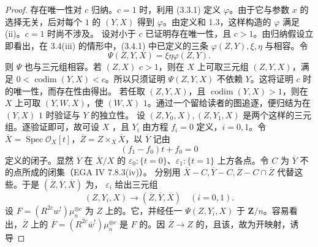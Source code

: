 \begin{proof}
存在唯一性对 $c$ 归纳。$c=1$ 时，利用 (3.3.1) 定义 $\varphi$。由于它与参数 $x$ 的选择无关，后对每个 $1$ 的 $(Y,X)$ 得到 $\varphi$。由定义和 1.3，这样构造的 $\varphi$ 满足 (ii)。$c=1$ 时尚不涉及。
设对小于 $c$ 已证明存在唯一性，且 $c>1$。由归纳假设立即看出，在 3.4(iii) 的情形中，(3.4.1) 中已定义的三条 $\varphi(Z,Y),\xi,\eta$ 与相容。令
\[\Psi(Z,Y,X)=\xi\eta\varphi(Z,Y).\]
则 $\Psi$ 也与三元组相容。若 $(Z,X)$  $c>1$，则在 $X$ 上可取三元组 $(Z,Y,X)$，满足 $0<\operatorname{codim}(Y,X)<c$。所以只须证明 $\Psi(Z,Y,X)$ 不依赖 $Y$。这将证明 $c$ 时的唯一性，而存在性由得出。
若任取 $(Z,Y,X)$，且 $\operatorname{codim}(Y,X)>1$，则在 $X$ 上可取 $(Y,W,X)$，使 $(W,X)$  $1$。通过一个留给读者的图追逐，便归结为在 $(Y,X)$  $1$ 时验证与 $Y$ 的独立性。
设 $(Z,Y_0,X),(Z,Y_1,X)$ 是两个这样的三元组。逐验证即可，故可设 $X$ ，且 $Y_i$ 由方程 $f_i=0$ 定义，$i=0,1$。令 $\overline X=\operatorname{Spec}\mathcal O_X[t]$，$\overline Z=Z\times_X\overline X$，以 $\overline Y$ 记由
\[(f_1-f_0)t+f_0=0\]
定义的闭子。显然 $\overline Y$ 在 $\overline X/X$ 的 $\varepsilon_0:\{t=0\}$、$\varepsilon_1:\{t=1\}$ 上方各点。令 $C$ 为 $\overline Y$ 不的点所成的闭集（EGA IV 7.8.3(iv)）。
分别用 $\overline X-C,\overline Y-C,\overline Z-C\cap\overline Z$ 代替这些。于是 $(\overline Z,\overline Y,\overline X)$ 为， $\varepsilon_i$ 给出三元组
\[(Z,Y_i,X)\longrightarrow(\overline Z,\overline Y,\overline X)\quad(i=0,1).\]
设 $F=(R^{2c}w^!)\mu_n^{\otimes c}$ 为 $Z$ 上的。它，并经任一 $\Psi(Z,Y_i,X)$ 于 $\mathbf Z/n$。容易看出，$\overline Z$ 上的 $\overline F=(R^{2c}\overline w^!)\mu_n^{\otimes c}$ 是 $F$ 的。因 $\overline Z\to Z$ 的，且该，故为开映射，诱导

\end{proof}
